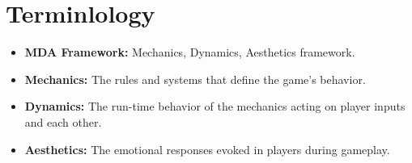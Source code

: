 \section{Terminlology}
\begin{itemize}
    \item \textbf{MDA Framework:} Mechanics, Dynamics, Aesthetics framework.
    \item \textbf{Mechanics:} The rules and systems that define the game's behavior.
    \item \textbf{Dynamics:} The run-time behavior of the mechanics acting on player inputs and each other.
    \item \textbf{Aesthetics:} The emotional responses evoked in players during gameplay.
\end{itemize}
